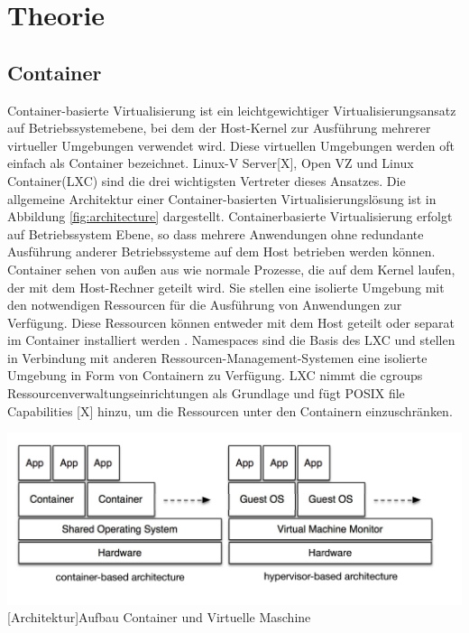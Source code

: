 \thispagestyle{empty}

\section{Theorie}



\subsection{Container}
Container-basierte Virtualisierung ist ein leichtgewichtiger Virtualisierungsansatz auf Betriebssystemebene, bei dem der Host-Kernel zur Ausführung mehrerer virtueller Umgebungen verwendet wird. Diese virtuellen Umgebungen werden oft einfach als \glqq Container \grqq{} bezeichnet. Linux-V Server[X], Open VZ\cite{IndexOpenvz.org} und Linux Container(LXC)\cite{IndexLinuxcontainers.Org} sind die drei wichtigsten Vertreter dieses Ansatzes. Die allgemeine Architektur einer Container-basierten Virtualisierungslösung ist in Abbildung \ref{fig:architecture} dargestellt. Containerbasierte Virtualisierung erfolgt auf Betriebssystem Ebene, so dass mehrere Anwendungen ohne redundante Ausführung anderer Betriebssysteme auf dem Host betrieben werden können. Container sehen von außen aus wie normale Prozesse, die auf dem Kernel laufen, der mit dem Host-Rechner geteilt wird. Sie stellen eine isolierte Umgebung mit den notwendigen Ressourcen für die Ausführung von Anwendungen zur Verfügung. Diese Ressourcen können entweder mit dem Host geteilt oder separat im Container installiert werden \cite{Xavier2014AClusters}. Namespaces sind die Basis des LXC und stellen in Verbindung mit anderen Ressourcen-Management-Systemen eine isolierte Umgebung in Form von Containern zu Verfügung. LXC nimmt die cgroups Ressourcenverwaltungseinrichtungen\cite{Heo2015ControlV2} als Grundlage und fügt POSIX file Capabilities [X] hinzu, um die Ressourcen unter den Containern einzuschränken. 

\vspace{1em}
\begin{minipage}{\linewidth}
	\centering
	\includegraphics[width=1\linewidth]{pics/docker2.png}
	[Architektur]{Aufbau Container und Virtuelle Maschine \cite{Xavier2015AClouds}}
	\label{fig:architecture}
\end{minipage}

